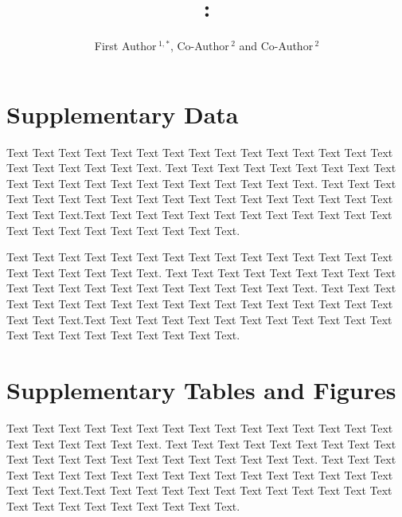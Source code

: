 \documentclass{frontiersSCNSsuppmat} %
\def\firstAuthorLast{Frontiers}
\def\Authors{First Author\,$^{1,*}$, Co-Author\,$^{2}$ and Co-Author\,$^2$}
\begin{document}
\onecolumn
{}

\title[Supplementary Material]{{}:\\ }
\author[\firstAuthorLast ]{\Authors}
\address{}
\correspondance{}
\extraAuth{}%
\topic{}%

\maketitle


\section{Supplementary Data}

%
Text Text Text Text Text Text  Text Text Text Text Text Text Text Text Text  Text Text Text Text Text Text. Text Text Text Text Text Text  Text Text Text Text Text Text Text Text Text  Text Text Text Text Text Text. Text Text Text Text Text Text  Text Text Text Text Text Text Text Text Text  Text Text Text Text Text Text.Text Text Text Text Text Text  Text Text Text Text Text Text Text Text Text  Text Text Text Text Text Text.

Text Text Text Text Text Text  Text Text Text Text Text Text Text Text Text  Text Text Text Text Text Text. Text Text Text Text Text Text  Text Text Text Text Text Text Text Text Text  Text Text Text Text Text Text. Text Text Text Text Text Text  Text Text Text Text Text Text Text Text Text  Text Text Text Text Text Text.Text Text Text Text Text Text  Text Text Text Text Text Text Text Text Text  Text Text Text Text Text Text.


\section{Supplementary Tables and Figures}

Text Text Text Text Text Text  Text Text Text Text Text Text Text Text Text  Text Text Text Text Text Text. Text Text Text Text Text Text  Text Text Text Text Text Text Text Text Text  Text Text Text Text Text Text. Text Text Text Text Text Text  Text Text Text Text Text Text Text Text Text  Text Text Text Text Text Text.Text Text Text Text Text Text  Text Text Text Text Text Text Text Text Text  Text Text Text Text Text Text.
\end{document}
